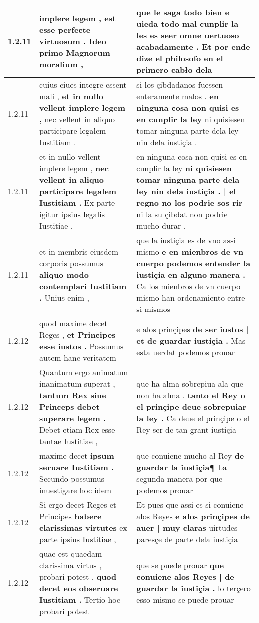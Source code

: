 \begin{tabular}{|p{1cm}|p{6.5cm}|p{6.5cm}|}
1.2.11 & implere legem , \textbf{ est esse perfecte virtuosum . } Ideo primo Magnorum moralium , & que le saga todo bien \textbf{ e uieda todo mal cunplir la les es seer omne uertuoso acabadamente . } Et por ende dize el philosofo en el primero cabło dela \\\hline
1.2.11 & cuius ciues integre essent mali , \textbf{ et in nullo vellent implere legem , } nec vellent in aliquo participare legalem Iustitiam . & si los çibdadanos fuessen enteramente malos . \textbf{ en ninguna cosa non quisi es en cunplir la ley } ni quisiesen tomar ninguna parte dela ley nin dela iustiçia . \\\hline
1.2.11 & et in nullo vellent implere legem , \textbf{ nec vellent in aliquo participare legalem Iustitiam . } Ex parte igitur ipsius legalis Iustitiae , & en ninguna cosa non quisi es en cunplir la ley \textbf{ ni quisiesen tomar ninguna parte dela ley nin dela iustiçia . | el regno no los podrie sos rir } ni la su çibdat non podrie mucho durar . \\\hline
1.2.11 & et in membris eiusdem corporis possumus \textbf{ aliquo modo contemplari Iustitiam . } Unius enim , & que la iustiçia es de vno assi mismo \textbf{ e en mienbros de vn cuerpo podemos entender la iustiçia en alguno manera . } Ca los mienbros de vn cuerpo mismo han ordenamiento entre si mismos \\\hline
1.2.12 & quod maxime decet Reges , \textbf{ et Principes esse iustos . } Possumus autem hanc veritatem & e alos prinçipes \textbf{ de ser iustos | et de guardar iustiçia . } Mas esta uerdat podemos prouar \\\hline
1.2.12 & Quantum ergo animatum inanimatum superat , \textbf{ tantum Rex siue Princeps debet superare legem . } Debet etiam Rex esse tantae Iustitiae , & que ha alma sobrepiua ala que non ha alma . \textbf{ tanto el Rey o el prinçipe deue sobrepuiar la ley . } Ca deue el prinçipe o el Rey ser de tan grant iustiçia \\\hline
1.2.12 & maxime decet \textbf{ ipsum seruare Iustitiam . } Secundo possumus inuestigare hoc idem & que conuiene mucho al Rey \textbf{ de guardar la iustiçia¶ } La segunda manera por que podemos prouar \\\hline
1.2.12 & Si ergo decet Reges et Principes \textbf{ habere clarissimas virtutes } ex parte ipsius Iustitiae , & Et pues que assi es si conuiene alos Reyes \textbf{ e alos prinçipes de auer | muy claras } uirtudes paresçe de parte dela iustiçia \\\hline
1.2.12 & quae est quaedam clarissima virtus , probari potest , \textbf{ quod decet eos obseruare Iustitiam . } Tertio hoc probari potest & que se puede prouar \textbf{ que conuiene alos Reyes | de guardar la iustiçia . } lo terçero esso mismo se puede prouar \\\hline

\end{tabular}
